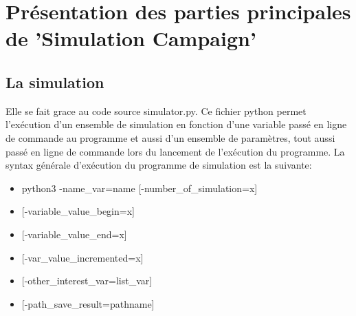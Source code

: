 \documentclass[a4paper, 11pt]{article}
\begin{document}
	\section{Présentation des parties principales de 'Simulation Campaign'}

		\subsection{La simulation}

			Elle se fait grace au code source simulator.py. Ce fichier python permet l'exécution d'un ensemble de simulation en fonction d'une variable passé en ligne de commande au programme et aussi d'un ensemble de paramètres, tout aussi passé en ligne de commande lors du lancement de l'exécution du programme. La syntax générale d'exécution du programme de simulation est la suivante:
			\begin{itemize}
				\item python3 -name\_var=name [-number\_of\_simulation=x]
				\item \hspace{4.51cm} [-variable\_value\_begin=x] 
				\item \hspace{4.51cm} [-variable\_value\_end=x] 
				\item \hspace{4.51cm} [-var\_value\_incremented=x]
				\item \hspace{4.51cm} [-other\_interest\_var=list\_var]
				\item \hspace{4.51cm} [-path\_save\_result=pathname]
			\end{itemize}
			
\end{document}
